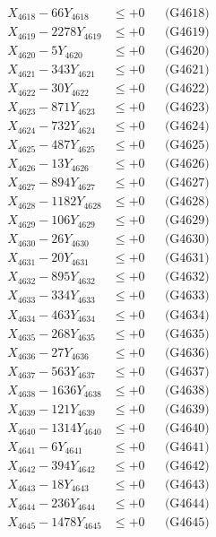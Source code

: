 \documentclass[a4paper,10pt]{article}
\begin{document}
{\begin{align}
X_{4618} - 66Y_{4618} &\leq +0 && \text{(G4618)} \\
X_{4619} - 2278Y_{4619} &\leq +0 && \text{(G4619)} \\
X_{4620} - 5Y_{4620} &\leq +0 && \text{(G4620)} \\
\allowbreak
X_{4621} - 343Y_{4621} &\leq +0 && \text{(G4621)} \\
X_{4622} - 30Y_{4622} &\leq +0 && \text{(G4622)} \\
X_{4623} - 871Y_{4623} &\leq +0 && \text{(G4623)} \\
X_{4624} - 732Y_{4624} &\leq +0 && \text{(G4624)} \\
X_{4625} - 487Y_{4625} &\leq +0 && \text{(G4625)} \\
X_{4626} - 13Y_{4626} &\leq +0 && \text{(G4626)} \\
X_{4627} - 894Y_{4627} &\leq +0 && \text{(G4627)} \\
X_{4628} - 1182Y_{4628} &\leq +0 && \text{(G4628)} \\
X_{4629} - 106Y_{4629} &\leq +0 && \text{(G4629)} \\
X_{4630} - 26Y_{4630} &\leq +0 && \text{(G4630)} \\
\allowbreak
X_{4631} - 20Y_{4631} &\leq +0 && \text{(G4631)} \\
X_{4632} - 895Y_{4632} &\leq +0 && \text{(G4632)} \\
X_{4633} - 334Y_{4633} &\leq +0 && \text{(G4633)} \\
X_{4634} - 463Y_{4634} &\leq +0 && \text{(G4634)} \\
X_{4635} - 268Y_{4635} &\leq +0 && \text{(G4635)} \\
X_{4636} - 27Y_{4636} &\leq +0 && \text{(G4636)} \\
X_{4637} - 563Y_{4637} &\leq +0 && \text{(G4637)} \\
X_{4638} - 1636Y_{4638} &\leq +0 && \text{(G4638)} \\
X_{4639} - 121Y_{4639} &\leq +0 && \text{(G4639)} \\
X_{4640} - 1314Y_{4640} &\leq +0 && \text{(G4640)} \\
\allowbreak
X_{4641} - 6Y_{4641} &\leq +0 && \text{(G4641)} \\
X_{4642} - 394Y_{4642} &\leq +0 && \text{(G4642)} \\
X_{4643} - 18Y_{4643} &\leq +0 && \text{(G4643)} \\
X_{4644} - 236Y_{4644} &\leq +0 && \text{(G4644)} \\
X_{4645} - 1478Y_{4645} &\leq +0 && \text{(G4645)} \\

\end{align}}
\end{document}
